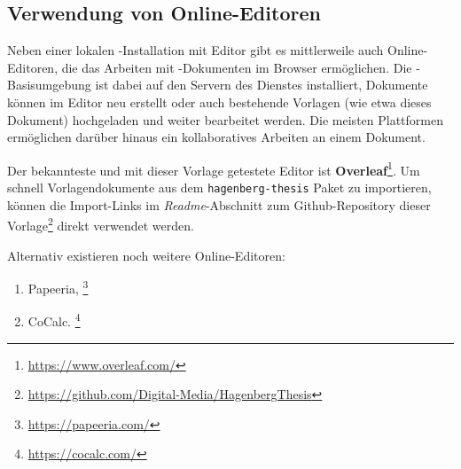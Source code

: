 \subsection{Verwendung von Online-Editoren}

Neben einer lokalen \latex-Installation mit Editor gibt es mittlerweile auch Online-Editoren, die das Arbeiten mit \latex-Dokumenten
im Browser ermöglichen. Die \latex-Basisumgebung ist dabei auf den Servern des Dienstes installiert, Dokumente können im Editor neu
erstellt oder auch bestehende Vorlagen (wie etwa dieses Dokument) hochgeladen und weiter bearbeitet werden. Die meisten Plattformen
ermöglichen darüber hinaus ein kollaboratives Arbeiten an einem Dokument.

Der bekannteste und mit dieser Vorlage getestete Editor ist \textbf{Overleaf}\footnote{\url{https://www.overleaf.com/}}. Um schnell
Vorlagendokumente aus dem \texttt{hagenberg-thesis} Paket zu importieren, können die Im\-port-Links im \emph{Readme}-Abschnitt zum Github-Repository
dieser Vorlage\footnote{\url{https://github.com/Digital-Media/HagenbergThesis}} direkt verwendet werden.

Alternativ existieren noch weitere Online-Editoren:
%
\begin{enumerate}
	\item Papeeria,%
	\footnote{\url{https://papeeria.com/}}
	\item CoCalc.%
	\footnote{\url{https://cocalc.com/}}
\end{enumerate}
